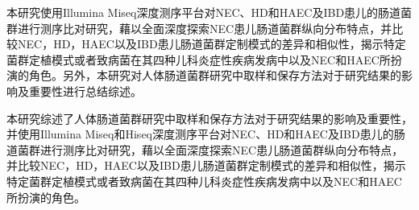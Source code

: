 本研究使用Illumina Miseq深度测序平台对NEC、HD和HAEC及IBD患儿的肠道菌群进行测序比对研究，藉以全面深度探索NEC患儿肠道菌群纵向分布特点，并比较NEC，HD，HAEC以及IBD患儿肠道菌群定制模式的差异和相似性，揭示特定菌群定植模式或者致病菌在其四种儿科炎症性疾病发病中以及NEC和HAEC所扮演的角色。另外，本研究对人体肠道菌群研究中取样和保存方法对于研究结果的影响及重要性进行总结综述。




本研究综述了人体肠道菌群研究中取样和保存方法对于研究结果的影响及重要性，并使用Illumina Miseq和Hiseq深度测序平台对NEC、HD和HAEC及IBD患儿的肠道菌群进行测序比对研究，藉以全面深度探索NEC患儿肠道菌群纵向分布特点，并比较NEC，HD，HAEC以及IBD患儿肠道菌群定制模式的差异和相似性，揭示特定菌群定植模式或者致病菌在其四种儿科炎症性疾病发病中以及NEC和HAEC所扮演的角色。
